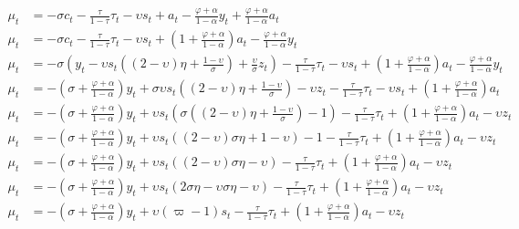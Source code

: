 \begin{align}
   \mu_t &= -\sigma c_t - \frac{\tau}{1-\tau}\tau_t - \upsilon s_t + a_t -\frac{\varphi + \alpha}{1-\alpha}y_t + \frac{\varphi + \alpha}{1-\alpha}a_t\\
   \mu_t &= -\sigma c_t - \frac{\tau}{1-\tau}\tau_t - \upsilon s_t + \left(1 + \frac{\varphi + \alpha}{1-\alpha}\right)a_t -\frac{\varphi + \alpha}{1-\alpha}y_t \\
   \mu_t &= -\sigma \left(y_t - \upsilon s_t \left( (2-\upsilon)\eta + \frac{1-\upsilon}{\sigma}\right) + \frac{\upsilon}{\sigma}z_t\right) - \frac{\tau}{1-\tau}\tau_t - \upsilon s_t + \left(1 + \frac{\varphi + \alpha}{1-\alpha}\right)a_t -\frac{\varphi + \alpha}{1-\alpha}y_t \\
   \mu_t &= -\left(\sigma + \frac{\varphi + \alpha}{1-\alpha}\right)y_t + \sigma \upsilon s_t \left( (2-\upsilon)\eta + \frac{1-\upsilon}{\sigma}\right) - \upsilon z_t- \frac{\tau}{1-\tau}\tau_t - \upsilon s_t + \left(1 + \frac{\varphi + \alpha}{1-\alpha}\right)a_t \\
   \mu_t &= -\left(\sigma + \frac{\varphi + \alpha}{1-\alpha}\right)y_t + \upsilon s_t \left(\sigma  \left( (2-\upsilon)\eta + \frac{1-\upsilon}{\sigma}\right)- 1 \right) - \frac{\tau}{1-\tau}\tau_t  + \left(1 + \frac{\varphi + \alpha}{1-\alpha}\right)a_t - \upsilon z_t\\
   \mu_t &= -\left(\sigma + \frac{\varphi + \alpha}{1-\alpha}\right)y_t + \upsilon s_t \left( (2-\upsilon)\sigma \eta + {1-\upsilon}\right)- 1 - \frac{\tau}{1-\tau}\tau_t  + \left(1 + \frac{\varphi + \alpha}{1-\alpha}\right)a_t - \upsilon z_t\\
   \mu_t &= -\left(\sigma + \frac{\varphi + \alpha}{1-\alpha}\right)y_t + \upsilon s_t \left( (2-\upsilon)\sigma \eta -\upsilon\right) - \frac{\tau}{1-\tau}\tau_t  + \left(1 + \frac{\varphi + \alpha}{1-\alpha}\right)a_t - \upsilon z_t\\
   \mu_t &= -\left(\sigma + \frac{\varphi + \alpha}{1-\alpha}\right)y_t + \upsilon s_t \left( 2\sigma \eta-\upsilon\sigma \eta -\upsilon\right) - \frac{\tau}{1-\tau}\tau_t  + \left(1 + \frac{\varphi + \alpha}{1-\alpha}\right)a_t - \upsilon z_t\\
   \mu_t &= -\left(\sigma + \frac{\varphi + \alpha}{1-\alpha}\right)y_t + \upsilon (\varpi - 1) s_t - \frac{\tau}{1-\tau}\tau_t  + \left(1 + \frac{\varphi + \alpha}{1-\alpha}\right)a_t - \upsilon z_t \label{eq:appendix_average_markup_end}
\end{align}